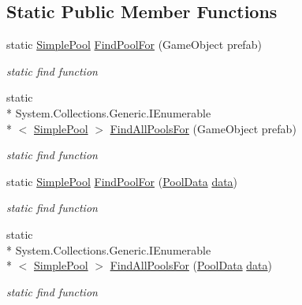 \subsection*{Static Public Member Functions}
\begin{DoxyCompactItemize}
\item 
static \hyperlink{class_hostile_1_1_simple_pool_1_1_simple_pool}{Simple\-Pool} \hyperlink{class_hostile_1_1_simple_pool_1_1_simple_pool_a8f57d91dc667ea0c0192b2f0f163edac}{Find\-Pool\-For} (Game\-Object prefab)
\begin{DoxyCompactList}\small\item\em static find function \end{DoxyCompactList}\item 
static \\*
System.\-Collections.\-Generic.\-I\-Enumerable\\*
$<$ \hyperlink{class_hostile_1_1_simple_pool_1_1_simple_pool}{Simple\-Pool} $>$ \hyperlink{class_hostile_1_1_simple_pool_1_1_simple_pool_aee3976823adab2701771b693b934b45b}{Find\-All\-Pools\-For} (Game\-Object prefab)
\begin{DoxyCompactList}\small\item\em static find function \end{DoxyCompactList}\item 
static \hyperlink{class_hostile_1_1_simple_pool_1_1_simple_pool}{Simple\-Pool} \hyperlink{class_hostile_1_1_simple_pool_1_1_simple_pool_ae43d8a26560d9f0962a1cc383464c3fe}{Find\-Pool\-For} (\hyperlink{class_hostile_1_1_simple_pool_1_1_simple_pool_1_1_pool_data}{Pool\-Data} \hyperlink{class_hostile_1_1_simple_pool_1_1_simple_pool_a59cc2475ae874886a60c3c457c9f6d17}{data})
\begin{DoxyCompactList}\small\item\em static find function \end{DoxyCompactList}\item 
static \\*
System.\-Collections.\-Generic.\-I\-Enumerable\\*
$<$ \hyperlink{class_hostile_1_1_simple_pool_1_1_simple_pool}{Simple\-Pool} $>$ \hyperlink{class_hostile_1_1_simple_pool_1_1_simple_pool_a7230180c05d43318ad9101996a947cb5}{Find\-All\-Pools\-For} (\hyperlink{class_hostile_1_1_simple_pool_1_1_simple_pool_1_1_pool_data}{Pool\-Data} \hyperlink{class_hostile_1_1_simple_pool_1_1_simple_pool_a59cc2475ae874886a60c3c457c9f6d17}{data})
\begin{DoxyCompactList}\small\item\em static find function \end{DoxyCompactList}\item 

\end{DoxyCompactItemize}
